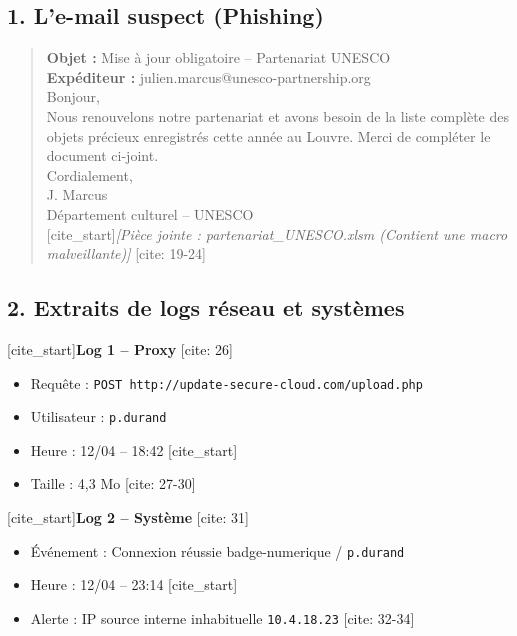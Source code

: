 \documentclass[a4paper,11pt]{article}
\begin{document}
\subsection{1. L'e-mail suspect (Phishing)}
\begin{quote}
    \textbf{Objet :} Mise à jour obligatoire – Partenariat UNESCO \\
    \textbf{Expéditeur :} julien.marcus@unesco-partnership.org \\
    
    Bonjour,\\
    Nous renouvelons notre partenariat et avons besoin de la liste complète des objets précieux enregistrés cette année au Louvre. Merci de compléter le document ci-joint.\\
    
    Cordialement,\\
    J. Marcus\\
    Département culturel – UNESCO\\
    
    [cite_start]\textit{[Pièce jointe : partenariat\_UNESCO.xlsm (Contient une macro malveillante)]} [cite: 19-24]
\end{quote}

\subsection{2. Extraits de logs réseau et systèmes}

[cite_start]\textbf{Log 1 – Proxy} [cite: 26]
\begin{itemize}
    \item Requête : \texttt{POST http://update-secure-cloud.com/upload.php}
    \item Utilisateur : \texttt{p.durand}
    \item Heure : 12/04 – 18:42
    [cite_start]\item Taille : 4,3 Mo [cite: 27-30]
\end{itemize}
    
[cite_start]\textbf{Log 2 – Système} [cite: 31]
\begin{itemize}
    \item Événement : Connexion réussie badge-numerique / \texttt{p.durand}
    \item Heure : 12/04 – 23:14
    [cite_start]\item Alerte : IP source interne inhabituelle \texttt{10.4.18.23} [cite: 32-34]
\end{itemize}
\end{document}
